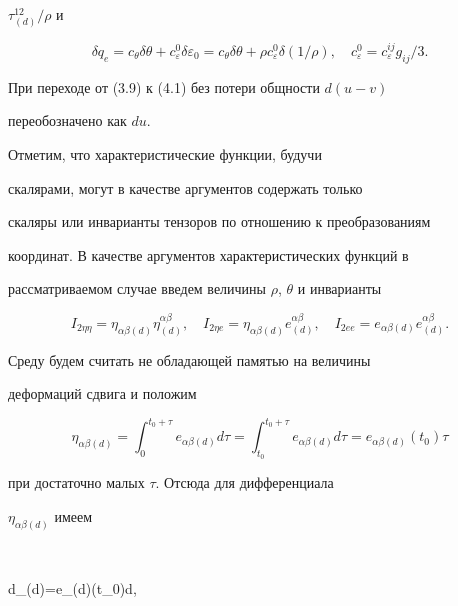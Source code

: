$\tau^{12}_{(d)}/\rho $ и


$$


\delta q_e=c_\theta\delta\theta+c^0_{\varepsilon}\delta\varepsilon_0=


c_\theta\delta\theta+\rho  c^0_\varepsilon\delta(1/\rho ),\quad


c^0_\varepsilon=c^{ij}_\varepsilon g_{ij}/3.


$$


При переходе от (3.9) к (4.1) без потери общности $d(u-v)$


переобозначено как $du$.





Отметим, что характеристические функции, будучи


скалярами, могут в качестве аргументов содержать только


скаляры или инварианты тензоров по отношению к преобразованиям


координат. В качестве аргументов характеристических функций в


рассматриваемом случае введем величины $\rho $, $\theta$ и инварианты


\begin{equation}


I_{2\eta\eta}=\eta_{\alpha\beta(d)}\eta^{\alpha\beta}_{(d)},\quad


I_{2\eta e}=\eta_{\alpha\beta(d)}e^{\alpha\beta}_{(d)},\quad


I_{2ee}=e_{\alpha\beta(d)}e^{\alpha\beta}_{(d)}.\tag{4.3}


\end{equation}


Среду будем считать не обладающей памятью на величины


деформаций сдвига и положим


\begin{equation}


\eta_{\alpha\beta(d)}=\int^{t_0+\tau}_0e_{\alpha\beta(d)}d\tau=


\int^{t_0+\tau}_{t_0}e_{\alpha\beta(d)}d\tau=


e_{\alpha\beta(d)}(t_0)\tau\tag{4.4}


\end{equation}


при достаточно малых $\tau$. Отсюда для дифференциала


$\eta_{\alpha\beta(d)}$ имеем


$$


d\eta_{\alpha\beta(d)}=e_{\alpha\beta(d)}(t_0)d\tau,


